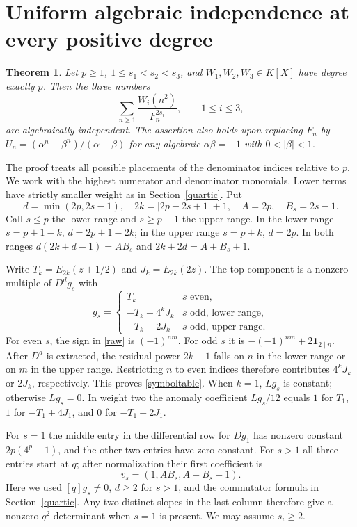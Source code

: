 \documentclass[11pt]{article}
\newtheorem{theorem}{Theorem}
\begin{document}
\clearpage
\section{Uniform algebraic independence at every positive degree}\label{global}
\begin{theorem}\label{full}
Let $p\ge1$, $1\le s_1<s_2<s_3$, and $W_1,W_2,W_3\in K[X]$ have degree exactly $p$. Then the three numbers
\[
 \sum_{n\ge1}\frac{W_i(n^2)}{F_n^{2s_i}},\qquad 1\le i\le3,
\]
are algebraically independent. The assertion also holds upon replacing $F_n$ by $U_n=(\alpha^n-\beta^n)/(\alpha-\beta)$ for any algebraic $\alpha\beta=-1$ with $0<|\beta|<1$.
\end{theorem}
The proof treats all possible placements of the denominator indices relative to $p$. We work with the highest numerator and denominator monomials. Lower terms have strictly smaller weight as in Section~\ref{quartic}. Put
\[
 d=\min(2p,2s-1),\quad 2k=|2p-2s+1|+1,\quad
 A=2p,\quad B_s=2s-1 .
\]
Call $s\le p$ the lower range and $s\ge p+1$ the upper range. In the lower range $s=p+1-k$, $d=2p+1-2k$; in the upper range $s=p+k$, $d=2p$. In both ranges $d(2k+d-1)=A B_s$ and $2k+2d=A+B_s+1$.

Write $T_k=E_{2k}(z+1/2)$ and $J_k=E_{2k}(2z)$. The top component is a nonzero multiple of $D^d g_s$ with
\begin{equation}\label{symboltable}
 g_s=\begin{cases}
 T_k & s\text{ even},\\
 -T_k+4^kJ_k & s\text{ odd, lower range},\\
 -T_k+2J_k & s\text{ odd, upper range}.
 \end{cases}
\end{equation}
For even $s$, the sign in \eqref{raw} is $(-1)^{nm}$. For odd $s$ it is $-(-1)^{nm}+2\boldsymbol1_{2\mid n}$. After $D^d$ is extracted, the residual power $2k-1$ falls on $n$ in the lower range or on $m$ in the upper range. Restricting $n$ to even indices therefore contributes $4^k J_k$ or $2J_k$, respectively. This proves \eqref{symboltable}. When $k=1$, $Lg_s$ is constant; otherwise $Lg_s=0$. In weight two the anomaly coefficient $Lg_s/12$ equals $1$ for $T_1$, $1$ for $-T_1+4J_1$, and $0$ for $-T_1+2J_1$.

For $s=1$ the middle entry in the differential row for $Dg_1$ has nonzero constant $2p(4^p-1)$, and the other two entries have zero constant. For $s>1$ all three entries start at $q$; after normalization their first coefficient is
\[
 v_s=(1,A B_s,A+B_s+1).
\]
Here we used $[q]g_s\ne0$, $d\ge2$ for $s>1$, and the commutator formula in Section~\ref{quartic}. Any two distinct slopes in the last column therefore give a nonzero $q^2$ determinant when $s=1$ is present. We may assume $s_i\ge2$.
\end{document}
